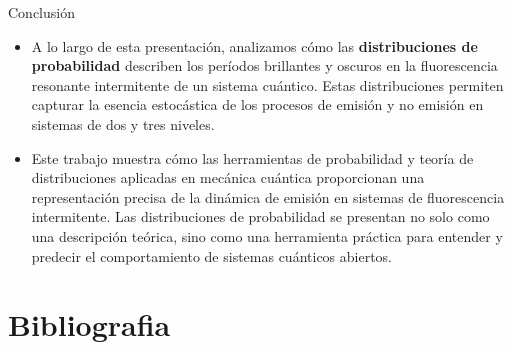 \documentclass[11pt]{beamer}
\begin{document}
\begin{frame}{Conclusión}

\justifying
\begin{itemize}
    \item A lo largo de esta presentación, analizamos cómo las \textbf{distribuciones de probabilidad} describen los períodos brillantes y oscuros en la fluorescencia resonante intermitente de un sistema cuántico. Estas distribuciones permiten capturar la esencia estocástica de los procesos de emisión y no emisión en sistemas de dos y tres niveles.
    
  
    
    \item Este trabajo muestra cómo las herramientas de probabilidad y teoría de distribuciones aplicadas en mecánica cuántica proporcionan una representación precisa de la dinámica de emisión en sistemas de fluorescencia intermitente. Las distribuciones de probabilidad se presentan no solo como una descripción teórica, sino como una herramienta práctica para entender y predecir el comportamiento de sistemas cuánticos abiertos.
    
\end{itemize}

\end{frame}


\section{Bibliografia}
 \begin{frame}[allowframebreaks]
    \smaller
    \vspace{-0.4em}
    \printbibliography
\end{frame}
\end{document}
